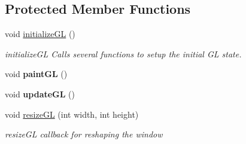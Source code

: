 \subsection*{Protected Member Functions}
\begin{DoxyCompactItemize}
\item 
\hypertarget{classglrenderer_ac168f504d3dc873dd032c996c962ad90}{void \hyperlink{classglrenderer_ac168f504d3dc873dd032c996c962ad90}{initialize\+G\+L} ()}\label{classglrenderer_ac168f504d3dc873dd032c996c962ad90}

\begin{DoxyCompactList}\small\item\em initialize\+G\+L Calls several functions to setup the initial G\+L state. \end{DoxyCompactList}\item 
\hypertarget{classglrenderer_a79e6616b1c2c34801742aaf69fc6e5df}{void {\bfseries paint\+G\+L} ()}\label{classglrenderer_a79e6616b1c2c34801742aaf69fc6e5df}

\item 
\hypertarget{classglrenderer_aee012c84c43499364df0c97a160169cf}{void {\bfseries update\+G\+L} ()}\label{classglrenderer_aee012c84c43499364df0c97a160169cf}

\item 
void \hyperlink{classglrenderer_a1743b7d54ffad4131e877486a99a568c}{resize\+G\+L} (int width, int height)
\begin{DoxyCompactList}\small\item\em resize\+G\+L callback for reshaping the window \end{DoxyCompactList}\end{DoxyCompactItemize}
